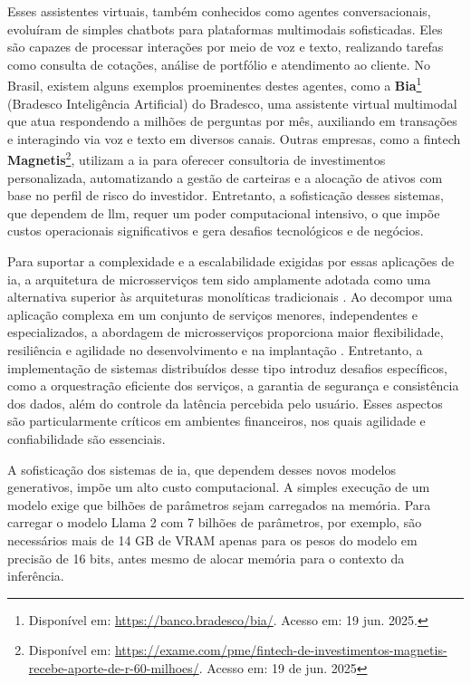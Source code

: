 Esses assistentes virtuais, também conhecidos como agentes conversacionais, evoluíram de simples chatbots para plataformas multimodais sofisticadas. Eles são capazes de processar interações por meio de voz e texto, realizando tarefas como consulta de cotações, análise de portfólio e atendimento ao cliente. No Brasil, existem alguns exemplos proeminentes destes agentes, como a 
\textbf{Bia}\footnote{Disponível em: \url{https://banco.bradesco/bia/}. Acesso em: 19 jun. 2025.} (Bradesco Inteligência Artificial) do Bradesco, uma assistente virtual multimodal que atua respondendo a milhões de perguntas por mês, auxiliando em transações e interagindo via voz e texto em diversos canais. Outras empresas, como a fintech \textbf{Magnetis}\footnote{Disponível em: \url{https://exame.com/pme/fintech-de-investimentos-magnetis-recebe-aporte-de-r-60-milhoes/}. Acesso em: 19 de jun. 2025}, utilizam a \gls{ia} para oferecer consultoria de investimentos personalizada, automatizando a gestão de carteiras e a alocação de ativos com base no perfil de risco do investidor. Entretanto, a sofisticação desses sistemas, que dependem de \gls{llm}, requer um poder computacional intensivo, o que impõe custos operacionais significativos e gera desafios tecnológicos e de negócios.

Para suportar a complexidade e a escalabilidade exigidas por essas aplicações de \gls{ia}, a arquitetura de microsserviços tem sido amplamente adotada como uma alternativa superior às arquiteturas monolíticas tradicionais \cite{newman_building_2022}. Ao decompor uma aplicação complexa em um conjunto de serviços menores, independentes e especializados, a abordagem de microsserviços proporciona maior flexibilidade, resiliência e agilidade no desenvolvimento e na implantação \cite{fowler_microsservicos_2022}. Entretanto, a implementação de sistemas distribuídos desse tipo introduz desafios específicos, como a orquestração eficiente dos serviços, a garantia de segurança e consistência dos dados, além do controle da latência percebida pelo usuário. Esses aspectos são particularmente críticos em ambientes financeiros, nos quais agilidade e confiabilidade são essenciais.

A sofisticação dos sistemas de \gls{ia}, que dependem desses novos modelos generativos, impõe um alto custo computacional. A simples execução de um modelo exige que bilhões de parâmetros sejam carregados na memória. Para carregar o modelo Llama 2 com 7 bilhões de parâmetros, por exemplo, são necessários mais de 14 GB de VRAM apenas para os pesos do modelo em precisão de 16 bits, antes mesmo de alocar memória para o contexto da inferência.

